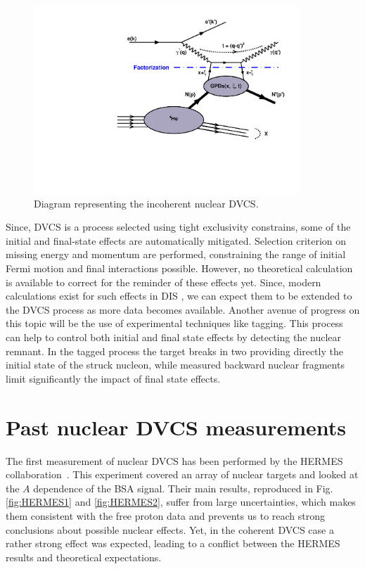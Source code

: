 \documentclass{article}
\begin{document}
\begin{figure}[tbp!]
\center
\includegraphics[width=10cm]{fig3/handbag_incoherent.pdf}
\caption{Diagram representing the incoherent nuclear DVCS.}
\label{fig:InCohDiag}
\end{figure}

Since, DVCS is a 
process selected using tight exclusivity constrains, some of the initial and final-state effects are
automatically mitigated. Selection criterion on missing energy and momentum are performed,
constraining the range of initial Fermi motion and final interactions possible. However, no theoretical
calculation is available to correct for the reminder of these effects yet. Since, modern calculations exist 
for such effects in DIS \cite{Cosyn:2017ekf}, we can expect them to be extended to the DVCS 
process as more data becomes available. Another avenue of progress
on this topic will be the use of experimental techniques like tagging. This process
can help to control both initial and final state effects by detecting the nuclear remnant.
In the tagged process the target breaks in two providing directly the initial state
of the struck nucleon, while measured backward nuclear fragments limit significantly the
impact of final state effects.

\section{Past nuclear DVCS measurements}

The first measurement of nuclear DVCS has been performed by the HERMES 
collaboration~\cite{Airapetian:2009cga}. This experiment covered an array of 
nuclear targets and looked at the $A$ dependence of the
BSA signal. Their main results, reproduced in Fig. \ref{fig:HERMES1} and \ref{fig:HERMES2}, suffer
from large uncertainties, which makes them consistent with the free proton data and prevents us to
reach strong conclusions about possible nuclear effects. Yet, in the coherent DVCS case a rather
strong effect was expected, leading to a conflict between the HERMES results and theoretical
expectations. 
\end{document}

